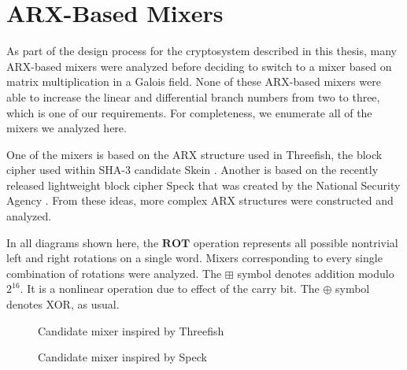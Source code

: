 \chapter{ARX-Based Mixers}
\label{appx:ARX_Mixers}
As part of the design process for the cryptosystem described in this thesis, many ARX-based mixers were analyzed before deciding to switch to a mixer based on matrix multiplication in a Galois field.
None of these ARX-based mixers were able to increase the linear and differential branch numbers from two to three, which is one of our requirements.
For completeness, we enumerate all of the mixers we analyzed here. 

One of the mixers is based on the ARX structure used in Threefish, the block cipher used within SHA-3 candidate Skein \cite{Ferguson2010_SkeinReference}. 
Another is based on the recently released lightweight block cipher Speck that was created by the National Security Agency \cite{Beaulieu2013_Speck}. 
From these ideas, more complex ARX structures were constructed and analyzed.

In all diagrams shown here, the $\mathbf{ROT}$ operation represents all possible nontrivial left and right rotations on a single word. 
Mixers corresponding to every single combination of rotations were analyzed.
The $\boxplus$ symbol denotes addition modulo $2^{16}$.
It is a nonlinear operation due to effect of the carry bit.
The $\oplus$ symbol denotes XOR, as usual.

\begin{figure}[ht]
\centering

\caption{Candidate mixer inspired by Threefish}
\end{figure}

\begin{figure}[ht]
\centering

\caption{Candidate mixer inspired by Speck}
\end{figure}



